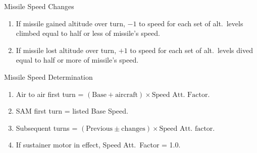 \begin{table}
\begin{minipage}{\linewidth}
\medskip
Missile Speed Changes
\medskip

\begin{enumerate}
    \item If missile gained altitude over turn, $-1$ to speed for each set of alt.\ levels climbed equal to half or less of missile's speed.
    \item If missile lost altitude over turn, $+1$ to speed for each set of alt.\ levels dived equal to half or more of missile's speed.
\end{enumerate}

\medskip
Missile Speed Determination
\medskip

\begin{enumerate}
    \item Air to air first turn = $(\textrm{Base} + \textrm{aircraft}) \times \textrm{Speed Att.\ Factor}$.
    \item SAM first turn = listed Base Speed.
    \item Subsequent turns = $(\textrm{Previous} \pm \textrm{changes})  \times \textrm{Speed Att.\ factor}$.
    \item If sustainer motor in effect, Speed Att.\ Factor = 1.0.
\end{enumerate}

\end{minipage}

\end{table}
